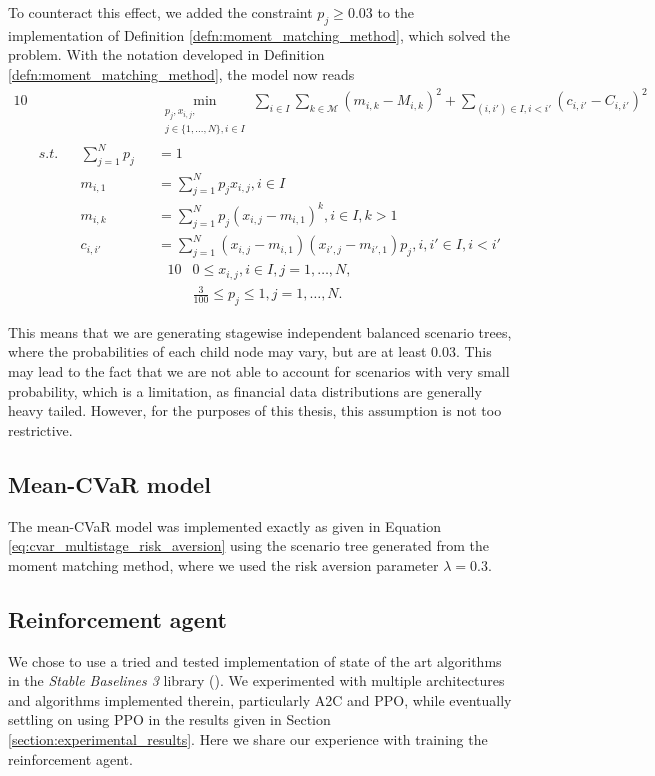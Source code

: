 To counteract this effect, we added the constraint $p_j \geq 0.03$ to the implementation of Definition \ref{defn:moment_matching_method}, which solved the problem. With the notation developed in Definition \ref{defn:moment_matching_method}, the model now reads
\begin{alignat}{10}
& && && \underset{\substack{p_j, x_{i,j}, \\ j \in \{1,...,N\}, i \in I}}{\min} \sum_{i\in I} \sum_{k\in \mathcal{M}} \left(m_{i,k} - M_{i,k}\right)^2 + \sum_{(i, i') \in I, i < i'}(c_{i,i'}-C_{i,i'})^2 \nonumber \\
& s.t. && \sum_{j=1}^N p_j&&=1 \nonumber \\
& && m_{i,1}&&=\sum_{j=1}^N p_jx_{i,j}, i \in I \nonumber \\
& && m_{i,k}&&=\sum_{j=1}^N p_j(x_{i,j}-m_{i,1})^k, i \in I, k>1 \nonumber \\
& && c_{i,i'}&&=\sum_{j=1}^N(x_{i,j}-m_{i,1})(x_{i',j}-m_{i',1})p_j, i,i' \in I, i<i' \nonumber
\end{alignat}
\vspace{-0.5cm}
\begin{alignat}{10}
& 0  \leq x_{i,j}, i \in I, j=1,\dots,N, \nonumber \\
& \frac{3}{100} \leq p_j \leq 1, j=1,\dots,N. \nonumber
\end{alignat}

This means that we are generating stagewise independent balanced scenario trees, where the probabilities of each child node may vary, but are at least 0.03. This may lead to the fact that we are not able to account for scenarios with very small probability, which is a limitation, as financial data distributions are generally heavy tailed. However, for the purposes of this thesis, this assumption is not too restrictive.


\subsection{Mean-CVaR model}
The mean-CVaR model was implemented exactly as given in Equation \ref{eq:cvar_multistage_risk_aversion} using the scenario tree generated from the moment matching method, where we used the risk aversion parameter $\lambda=0.3.$
\subsection{Reinforcement agent}
We chose to use a tried and tested implementation of state of the art algorithms in the \textit{Stable Baselines 3} library (\cite{stable_baselines3}). We experimented with multiple architectures and algorithms implemented therein, particularly A2C and PPO, while eventually settling on using PPO in the results given in Section \ref{section:experimental_results}. Here we share our experience with training the reinforcement agent.

